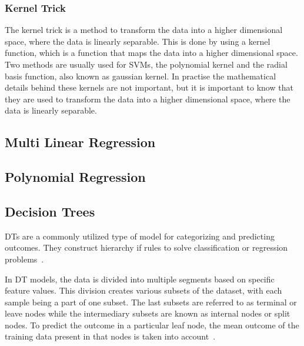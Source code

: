 \subsubsection*{Kernel Trick}

The kernel trick is a method to transform the data into a higher dimensional
space, where the
data is linearly
separable.
This is done by using a kernel function, which is a function that maps the
data into a higher
dimensional space.
Two methods are usually used for \ac{SVM}s, the polynomial kernel and the
radial basis function,
also known as gaussian kernel.
\cite[p. 97-98]{muller_introductionmachinelearning_2016}
In practise the mathematical details behind these kernels are not important,
but it is important
to know that they are used to transform the data into a higher dimensional
space, where the data
is linearly separable.

\subsection{Multi Linear Regression}\label{subsec:multi-linear-regression}

\subsection{Polynomial Regression}\label{subsec:polynomial-regression}

\subsection{Decision Trees}\label{subsec:decision-tree-regression}
\ac{DT}s are a commonly utilized type of model for categorizing and
predicting outcomes.
They construct hierarchy if rules to solve classification or regression
problems~\cite[p.
70]{muller_introductionmachinelearning_2016}.

In \ac{DT} models, the data is divided into multiple segments based on
specific feature values.
This division creates various subsets of the dataset, with each sample being
a part of one subset.
The last subsets are referred to as terminal or leave nodes while the
intermediary subsets are
known as internal nodes or split nodes.
To predict the outcome in a particular leaf node, the mean outcome of the
training data present
in that nodes is taken into account~\cite[p. 76]{molnar2020interpretable}.

